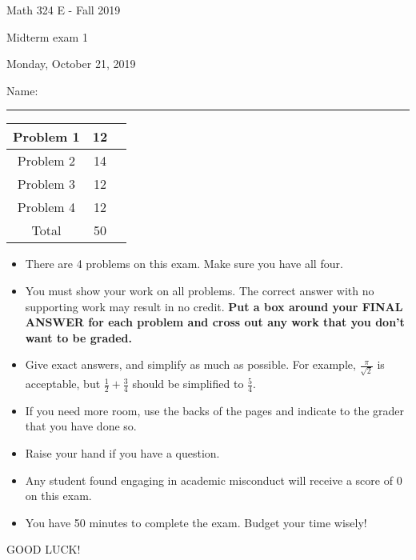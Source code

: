 \documentclass[12 pt]{report}
\begin{document}
\noindent \vfill \noindent \large

\centerline{Math 324 E - Fall 2019}

\centerline{Midterm exam 1}

\centerline{Monday, October 21, 2019}

\normalsize

\vfill
\medskip
Name: \rule{10cm}{1pt}

\bigskip

\vfill
\begin{center}
{\large
\begin{tabular}{||c|c|r||}
\hline Problem 1 & 12 & \hspace{10mm} \hfill \\
\hline Problem 2 & 14 & \hspace{10mm} \hfill \\
\hline Problem 3 & 12 & \hspace{10mm} \hfill \\
\hline Problem 4 & 12 & \hspace{10mm} \hfill \\
\hline Total & 50 & \hspace{10mm} \hfill \\
\hline
\end{tabular}
}
\end{center}
\vfill
\begin{itemize}
\item There are 4 problems on this exam. Make sure you have all four.
\item You must show your work on all problems.  The correct answer
with no supporting work may result in no credit. \textbf{Put a box
around your FINAL ANSWER for each problem and cross out any work
that you don't want to be graded.} 
\item Give exact answers, and simplify as much as possible. 
For example, $\frac{\pi}{\sqrt{2}}$ is acceptable, but $\frac{1}{2} + \frac{3}{4}$
should be simplified to $\frac{5}{4}$.   

\item If you need more room, use the backs
of the pages and indicate to the grader that you have done so.
\item Raise your hand if you have a question.
\item Any student found engaging in academic misconduct will receive
a score of 0 on this exam.
\item You have 50 minutes to complete the exam.  Budget your time wisely! \\
\end{itemize}
\vfill
\begin{center}GOOD LUCK!\end{center}
\end{document}
